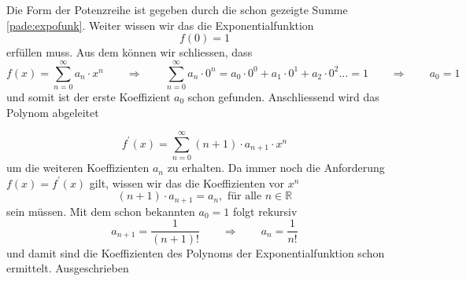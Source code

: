 Die Form der Potenzreihe ist gegeben durch die schon gezeigte Summe \ref{pade:expofunk}.
Weiter wissen wir das die Exponentialfunktion 
\begin{equation*}
f(0) = 1
\end{equation*}
erfüllen muss.
Aus dem können wir schliessen, dass
\begin{equation*}
f(x)=\sum_{n=0}^{\infty} a_{n} \cdot x^{n}
\qquad\Rightarrow\qquad
\sum_{n=0}^{\infty} a_{n} \cdot 0^{n} 
=
a_{0} \cdot 0^{0} + a_{1} \cdot 0^{1} + a_{2} \cdot 0^{2} \dots = 1
\qquad\Rightarrow\qquad
a_{0} = 1
\end{equation*}
und somit ist der erste Koeffizient $a_0$ schon gefunden.
Anschliessend wird das Polynom abgeleitet

\begin{equation*}
f^{\prime}(x)
=
\sum_{n=0}^{\infty}(n+1) \cdot a_{n+1} \cdot x^{n}
\end{equation*}
um die weiteren Koeffizienten $a_n$ zu erhalten.
Da immer noch die Anforderung $f(x) = f^{\prime}(x)$ gilt, wissen wir das die Koeffizienten vor $x^n$ 
\begin{equation*}
(n+1) \cdot a_{n+1} 
= 
a_{n} , \text{ für alle } n \in \mathbb{R}
\end{equation*}
sein müssen. 
Mit dem schon bekannten $a_0 = 1$ folgt rekursiv
\begin{equation*}
a_{n+1} 
= 
\frac{1}{(n+1)!}
\qquad\Rightarrow\qquad
a_{n} 
= 
\frac{1}{n!}
\end{equation*}
und damit sind die Koeffizienten des Polynoms der Exponentialfunktion schon ermittelt.
Ausgeschrieben 


